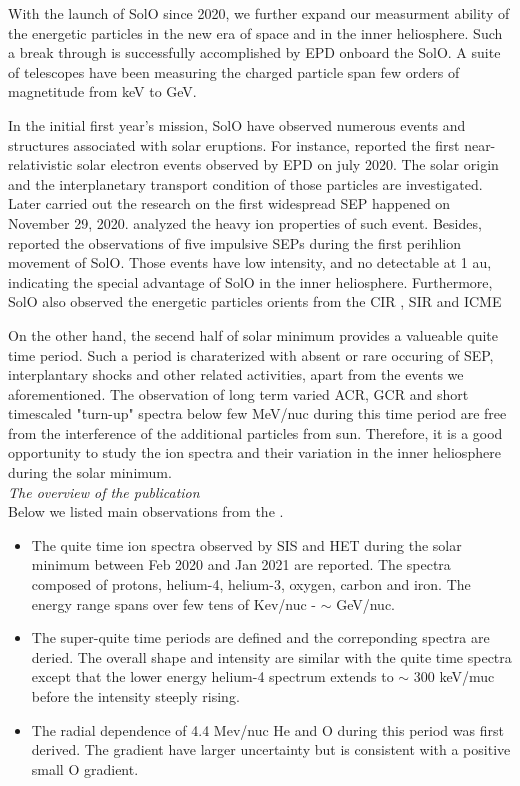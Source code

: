 
With the launch of \ac{SolO} since 2020, we further expand our measurment ability of the energetic particles in the new era of space and in the inner heliosphere. Such a break through is successfully accomplished by \ac{EPD} onboard the \ac{SolO}. A suite of telescopes have been measuring the charged particle span few orders of magnetitude from keV to GeV.

In the initial first year's mission, \ac{SolO} have observed numerous events and structures associated with solar eruptions. For instance, \citet{GomezHerrero-2021-SolO} reported the first near-relativistic solar electron events observed by \ac{EPD} on july 2020. The solar origin and the interplanetary transport condition of those particles are investigated. Later \citet{Kolhoff2021AA} carried out the research on the first widespread \ac{SEP} happened on November 29, 2020. \citet{Mason2021AA} analyzed the heavy ion properties of such event. Besides, \citet{Mason2021AA_he3rich} reported the observations of five impulsive \acp{SEP} during the first perihlion movement of \ac{SolO}. Those events have low intensity, and no detectable at 1 au, indicating the special advantage of \ac{SolO} in the inner heliosphere. Furthermore, \ac{SolO} also observed the energetic particles orients from the \ac{CIR} \citep{Allen2021AA_suprathermal}, \ac{SIR} \cite{Aran2021AA} and \ac{ICME} \citep{Kilpua2021AA}


On the other hand, the secend half of solar minimum provides a valueable quite time period. Such a period is charaterized with absent or rare occuring of \ac{SEP}, interplantary shocks and other related activities, apart from the events we aforementioned. The observation of long term varied \ac{ACR}, \ac{GCR} and short timescaled "turn-up" spectra below few MeV/nuc during this time period are free from the interference of the additional particles from sun. Therefore, it is a good opportunity to study the ion spectra and their variation in the inner heliosphere during the solar minimum.
\\
\textit{The overview of the publication}\\
Below we listed main observations from the \citep{Mason-2021-SolOQuietTime}.

\begin{itemize}
    \item The quite time ion spectra observed by SIS and HET during the solar minimum between Feb 2020 and Jan 2021 are reported. The spectra composed of protons, helium-4, helium-3, oxygen, carbon and iron. The energy range spans over few tens of Kev/nuc - $\sim$ GeV/nuc.
    \item The super-quite time periods are defined and the correponding spectra are deried. The overall shape and intensity are similar with the quite time spectra except that the lower energy helium-4 spectrum extends to $\sim$ 300 keV/muc before the intensity steeply rising.
    \item The radial dependence of 4.4 Mev/nuc He and O during this period was first derived. The gradient have larger uncertainty but is consistent with a positive small O gradient.
\end{itemize}
